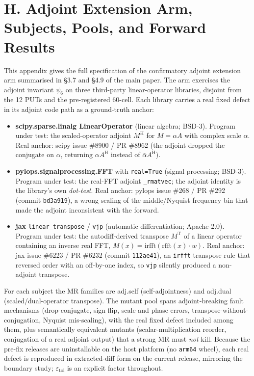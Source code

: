 \documentclass[manuscript,screen,review]{acmart}
\begin{document}
\section{H. Adjoint Extension Arm, Subjects, Pools, and Forward
Results}\label{h.-adjoint-extension-arm}

This appendix gives the full specification of the confirmatory adjoint
extension arm summarised in §3.7 and §4.9 of the main paper. The arm
exercises the adjoint invariant $\psi_6$ on three third-party
linear-operator libraries, disjoint from the 12 PUTs and the
pre-registered 60-cell. Each library carries a real fixed defect in its
adjoint code path as a ground-truth anchor:

\begin{itemize}

\item
  \textbf{scipy.sparse.linalg LinearOperator} (linear algebra; BSD-3).
  Program under test: the scaled-operator adjoint $M^{\mathrm{H}}$ for
  $M = \alpha A$ with complex scale $\alpha$. Real anchor: scipy issue
  \#8900 / PR \#8962 (the adjoint dropped the conjugate on $\alpha$,
  returning $\alpha A^{\mathrm{H}}$ instead of $\bar{\alpha}
  A^{\mathrm{H}}$).
\item
  \textbf{pylops.signalprocessing.FFT} with \texttt{real=True} (signal
  processing; BSD-3). Program under test: the real-FFT adjoint
  \texttt{\_rmatvec}; the adjoint identity is the library's own
  \emph{dot-test}. Real anchor: pylops issue \#268 / PR \#292 (commit
  \texttt{bd3a919}), a wrong scaling of the middle/Nyquist frequency bin
  that made the adjoint inconsistent with the forward.
\item
  \textbf{jax} \texttt{linear\_transpose} / \texttt{vjp} (automatic
  differentiation; Apache-2.0). Program under test: the autodiff-derived
  transpose $M^{\mathrm{T}}$ of a linear operator containing an inverse
  real FFT, $M(x) = \mathrm{irfft}(\mathrm{rfft}(x)\cdot w)$. Real anchor:
  jax issue \#6223 / PR \#6232 (commit \texttt{112ae41}), an
  \texttt{irfft} transpose rule that reversed order with an off-by-one
  index, so \texttt{vjp} silently produced a non-adjoint transpose.
\end{itemize}

For each subject the MR families are adj.self (self-adjointness) and
adj.dual (scaled/dual-operator transpose). The mutant pool spans
adjoint-breaking fault mechanisms (drop-conjugate, sign flip, scale and
phase errors, transpose-without-conjugation, Nyquist mis-scaling), with
the real fixed defect included among them, plus semantically equivalent
mutants (scalar-multiplication reorder, conjugation of a real adjoint
output) that a strong MR must \emph{not} kill. Because the pre-fix
releases are uninstallable on the host platform (no \texttt{arm64} wheel),
each real defect is reproduced in extracted-diff form on the current
release, mirroring the boundary study; $\varepsilon_{\mathrm{tol}}$ is an
explicit factor throughout.
\end{document}
